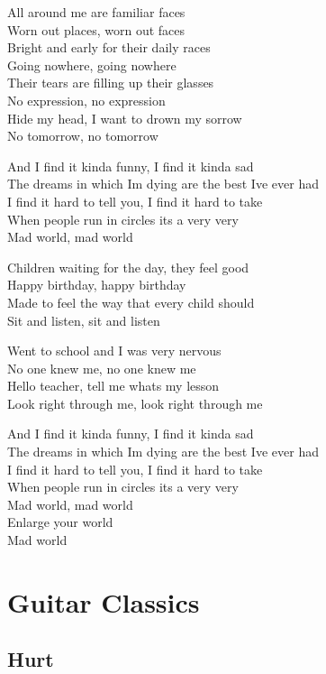 \documentclass[
  letterpaper,
  twoside=false]{scrbook}
\begin{document}
All around me are familiar faces\\
Worn out places, worn out faces\\
Bright and early for their daily races\\
Going nowhere, going nowhere\\
Their tears are filling up their glasses\\
No expression, no expression\\
Hide my head, I want to drown my sorrow\\
No tomorrow, no tomorrow

And I find it kinda funny, I find it kinda sad\\
The dreams in which I\textquotesingle m dying are the best
I\textquotesingle ve ever had\\
I find it hard to tell you, I find it hard to take\\
When people run in circles it\textquotesingle s a very very\\
Mad world, mad world

Children waiting for the day, they feel good\\
Happy birthday, happy birthday\\
Made to feel the way that every child should\\
Sit and listen, sit and listen

Went to school and I was very nervous\\
No one knew me, no one knew me\\
Hello teacher, tell me what\textquotesingle s my lesson\\
Look right through me, look right through me

And I find it kinda funny, I find it kinda sad\\
The dreams in which I\textquotesingle m dying are the best
I\textquotesingle ve ever had\\
I find it hard to tell you, I find it hard to take\\
When people run in circles it\textquotesingle s a very very\\
Mad world, mad world\\
Enlarge your world\\
Mad world

\part{Guitar Classics}

\hypertarget{hurt}{%
\chapter{Hurt}\label{hurt}}
\end{document}
